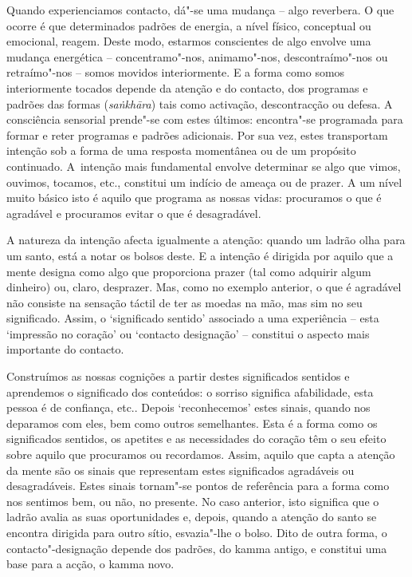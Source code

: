 Quando experienciamos contacto, dá"-se uma mudança -- algo reverbera. O que
ocorre é que determinados padrões de energia, a nível físico, conceptual ou
emocional, reagem. Deste modo, estarmos conscientes de algo envolve uma mudança
energética -- concentramo"-nos, animamo"-nos, descontraímo"-nos ou retraímo"-nos --
somos movidos interiormente. E a forma como somos interiormente tocados depende
da atenção e do contacto, dos programas e padrões das formas (\emph{saṅkhāra})
tais como activação, descontracção ou defesa. A consciência sensorial prende"-se
com estes últimos: encontra"-se programada para formar e reter programas e
padrões adicionais. Por sua vez, estes transportam intenção sob a forma de uma
resposta momentânea ou de um propósito continuado. A~intenção mais fundamental
envolve determinar se algo que vimos, ouvimos, tocamos, etc., constitui um
indício de ameaça ou de prazer. A um nível muito básico isto é aquilo que
programa as nossas vidas: procuramos o que é agradável e procuramos evitar o que
é desagradável.

A natureza da intenção afecta igualmente a atenção: quando um ladrão olha para
um santo, está a notar os bolsos deste. E a intenção é dirigida por aquilo que a
mente designa como algo que proporciona prazer (tal como adquirir algum
dinheiro) ou, claro, desprazer. Mas, como no exemplo anterior, o que é agradável
não consiste na sensação táctil de ter as moedas na mão, mas sim no seu
significado. Assim, o `significado sentido' associado a uma experiência -- esta
`impressão no coração' ou `contacto designação' -- constitui o aspecto mais
importante do contacto. 

Construímos as nossas cognições a partir destes
significados sentidos e aprendemos o significado dos conteúdos: o sorriso
significa afabilidade, esta pessoa é de confiança, etc.. Depois `reconhecemos'
estes sinais, quando nos deparamos com eles, bem como outros semelhantes. Esta é
a forma como os significados sentidos, os apetites e as necessidades do coração
têm o seu efeito sobre aquilo que procuramos ou recordamos. Assim, aquilo que
capta a atenção da mente são os sinais que representam estes significados
agradáveis ou desagradáveis. Estes sinais tornam"-se pontos de referência para a
forma como nos sentimos bem, ou não, no presente. No caso anterior, isto
significa que o ladrão avalia as suas oportunidades e, depois, quando a atenção
do santo se encontra dirigida para outro sítio, esvazia"-lhe o bolso. Dito de
outra forma, o contacto"-designação depende dos padrões, do kamma antigo, e
constitui uma base para a acção, o kamma novo.

